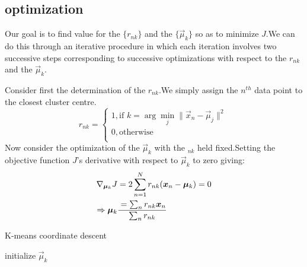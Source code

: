 \subsection{optimization}
Our goal is to find value for the $\{r_{nk}\}$ and the $\{\vec{\mu}_k\}$ so as to minimize $J$.We can do this through an iterative procedure in which each iteration involves two successive steps corresponding to successive optimizations with respect to the $r_{nk}$ and the $\vec{\mu}_k$.

Consider first the determination of the $r_{nk}$.We simply assign the $n^{th}$ data point to the closest cluster centre.
\begin{equation}
r_{nk} = \begin{cases}
1,\text{if }k=\arg\min_j\parallel \vec{x}_n-\vec{\mu}_j\parallel^2 \\
0,\text{otherwise} \\
\end{cases}
\end{equation}
Now consider the optimization of the $\vec{\mu}_k$ with the $_{nk}$ held fixed.Setting the objective function $J$'s derivative with respect to $\vec{\mu}_k$ to zero giving:
\begin{align}
	\nabla_{\vec{\mu}_k} J
	&=2\sum_{n=1}^{N}r_{nk}(\vec{x}_n-\vec{\mu}_k)=0 \\
	\Rightarrow \vec{\mu}_k 
	&=\sum_n{r_{nk}\vec{x}_n} \over \sum_n{r_{nk}}
\end{align}

\begin{algorithm}[H]
	\caption{{\sc K-means} coordinate descent}
	\label{algo:K-means}
	 initialize $\vec{\mu}_k$\;

\end{algorithm}

